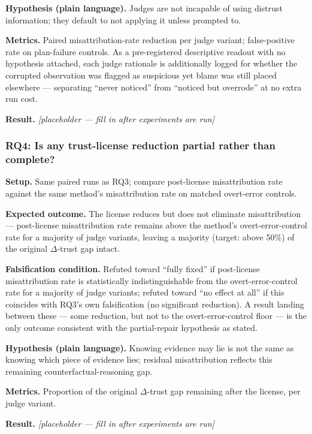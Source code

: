 \documentclass[11pt]{article}
\newcommand{\ph}{\textit{[placeholder --- fill in after experiments are run]}}
\begin{document}
\textbf{Hypothesis (plain language).} Judges are not incapable of using distrust information; they default to not applying it unless prompted to.

\textbf{Metrics.} Paired misattribution-rate reduction per judge variant; false-positive rate on plan-failure controls. As a pre-registered descriptive readout with no hypothesis attached, each judge rationale is additionally logged for whether the corrupted observation was flagged as suspicious yet blame was still placed elsewhere --- separating ``never noticed'' from ``noticed but overrode'' at no extra run cost.

\textbf{Result.} \ph

\subsubsection{RQ4: Is any trust-license reduction partial rather than complete?}
\textbf{Setup.} Same paired runs as RQ3; compare post-license misattribution rate against the same method's misattribution rate on matched overt-error controls.

\textbf{Expected outcome.} The license reduces but does not eliminate misattribution --- post-license misattribution rate remains above the method's overt-error-control rate for a majority of judge variants, leaving a majority (target: above 50\%) of the original $\Delta$-trust gap intact.

\textbf{Falsification condition.} Refuted toward ``fully fixed'' if post-license misattribution rate is statistically indistinguishable from the overt-error-control rate for a majority of judge variants; refuted toward ``no effect at all'' if this coincides with RQ3's own falsification (no significant reduction). A result landing between these --- some reduction, but not to the overt-error-control floor --- is the only outcome consistent with the partial-repair hypothesis as stated.

\textbf{Hypothesis (plain language).} Knowing evidence may lie is not the same as knowing which piece of evidence lies; residual misattribution reflects this remaining counterfactual-reasoning gap.

\textbf{Metrics.} Proportion of the original $\Delta$-trust gap remaining after the license, per judge variant.

\textbf{Result.} \ph
\end{document}
